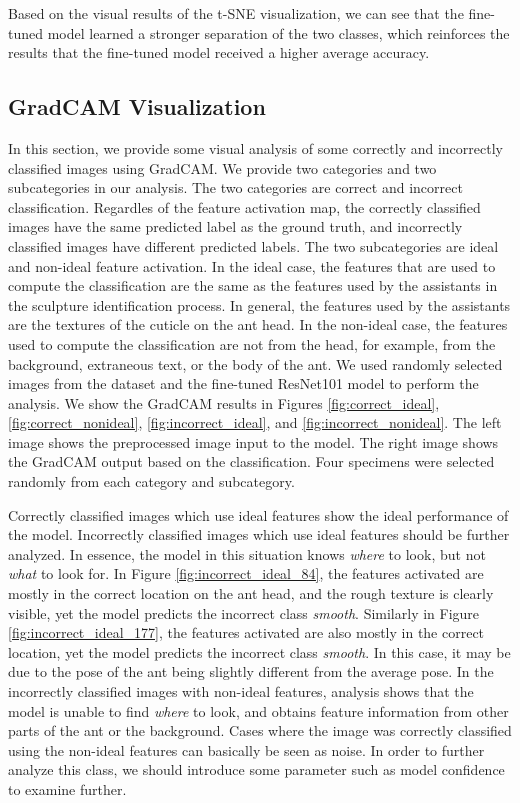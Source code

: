 \documentclass{aci}
\numberwithin{equation}{section}
\begin{document}
Based on the visual results of the t-SNE visualization, we can see that the
fine-tuned model learned a stronger separation of the two classes, which
reinforces the results that the fine-tuned model received a higher average
accuracy.

\subsection{GradCAM Visualization}

In this section, we provide some visual analysis of some correctly and
incorrectly classified images using GradCAM. We provide two categories and two
subcategories in our analysis. The two categories are correct and incorrect
classification. Regardles of the feature activation map, the correctly
classified images have the same predicted label as the ground truth, and
incorrectly classified images have different predicted labels. The two
subcategories are ideal and non-ideal feature activation. In the ideal case, the
features that are used to compute the classification are the same as the
features used by the assistants in the sculpture identification process. In
general, the features used by the assistants are the textures of the cuticle on
the ant head. In the non-ideal case, the features used to compute the
classification are not from the head, for example, from the background,
extraneous text, or the body of the ant. We used randomly selected images from
the dataset and the fine-tuned ResNet101 model to perform the analysis. We show
the GradCAM results in Figures \ref{fig:correct_ideal},
\ref{fig:correct_nonideal}, \ref{fig:incorrect_ideal}, and
\ref{fig:incorrect_nonideal}. The left image shows the preprocessed image input
to the model. The right image shows the GradCAM output based on the
classification. Four specimens were selected randomly from each category and
subcategory.

Correctly classified images which use ideal features show the ideal performance
of the model. Incorrectly classified images which use ideal features should be
further analyzed. In essence, the model in this situation knows \textit{where}
to look, but not \textit{what} to look for. In Figure
\ref{fig:incorrect_ideal_84}, the features activated are mostly in the correct
location on the ant head, and the rough texture is clearly visible, yet the
model predicts the incorrect class \textit{smooth}. Similarly in Figure
\ref{fig:incorrect_ideal_177}, the features activated are also mostly in the
correct location, yet the model predicts the incorrect class \textit{smooth}. In
this case, it may be due to the pose of the ant being slightly different from
the average pose. In the incorrectly classified images with non-ideal features,
analysis shows that the model is unable to find \textit{where} to look, and
obtains feature information from other parts of the ant or the background. Cases
where the image was correctly classified using the non-ideal features can
basically be seen as noise. In order to further analyze this class, we should
introduce some parameter such as model confidence to examine further.
\end{document}
